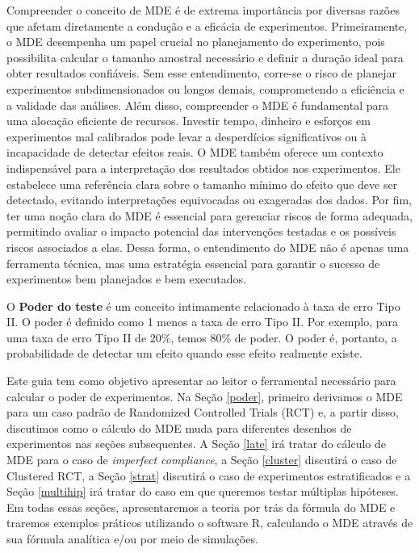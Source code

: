 Compreender o conceito de MDE é de extrema importância por diversas razões que afetam diretamente a condução e a eficácia de experimentos. Primeiramente, o MDE desempenha um papel crucial no planejamento do experimento, pois possibilita calcular o tamanho amostral necessário e definir a duração ideal para obter resultados confiáveis. Sem esse entendimento, corre-se o risco de planejar experimentos subdimensionados ou longos demais, comprometendo a eficiência e a validade das análises. Além disso, compreender o MDE é fundamental para uma alocação eficiente de recursos. Investir tempo, dinheiro e esforços em experimentos mal calibrados pode levar a desperdícios significativos ou à incapacidade de detectar efeitos reais. O MDE também oferece um contexto indispensável para a interpretação dos resultados obtidos nos experimentos. Ele estabelece uma referência clara sobre o tamanho mínimo do efeito que deve ser detectado, evitando interpretações equivocadas ou exageradas dos dados. Por fim, ter uma noção clara do MDE é essencial para gerenciar riscos de forma adequada, permitindo avaliar o impacto potencial das intervenções testadas e os possíveis riscos associados a elas. Dessa forma, o entendimento do MDE não é apenas uma ferramenta técnica, mas uma estratégia essencial para garantir o sucesso de experimentos bem planejados e bem executados.

O \textbf{Poder do teste} é um conceito intimamente relacionado à taxa de erro Tipo II. O poder é definido como 1 menos a taxa de erro Tipo II. Por exemplo, para uma taxa de erro Tipo II de 20\%, temos 80\% de poder. O poder é, portanto, a probabilidade de detectar um efeito quando esse efeito realmente existe.

Este guia tem como objetivo apresentar ao leitor o ferramental necessário para calcular o poder de experimentos. Na Seção \ref{poder}, primeiro derivamos o MDE para um caso padrão de Randomized Controlled Trials (RCT) e, a partir disso, discutimos como o cálculo do MDE muda para diferentes desenhos de experimentos nas seções subsequentes. A Seção \ref{late} irá tratar do cálculo de MDE para o caso de \textit{imperfect compliance}, a Seção \ref{cluster} discutirá o caso de Clustered RCT, a Seção \ref{strat} discutirá o caso de experimentos estratificados e a Seção \ref{multihip} irá tratar do caso em que queremos testar múltiplas hipóteses. Em todas essas seções, apresentaremos a teoria por trás da fórmula do MDE e traremos exemplos práticos utilizando o software R, calculando o MDE através de sua fórmula analítica e/ou por meio de simulações. 